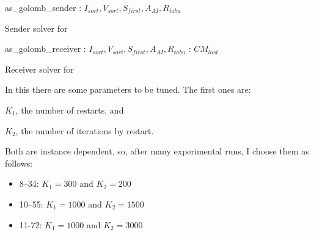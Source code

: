 \begin{algorithm}
\dontprintsemicolon
\SetNoline
{}
   as\_golomb\_sender\;
\algoindent {} : $I_{sort}, V_{sort}, S_{first}, A_{AI}, R_{tabu}$ \;
\caption{Sender solver for \GRP}\label{as:golomb_sender}
\end{algorithm}

\begin{algorithm}
\dontprintsemicolon
\SetNoline
{}
   as\_golomb\_receiver\;
\algoindent {} : $I_{sort}, V_{sort}, S_{first}, A_{AI}, R_{tabu}$ \;
\algoindent {}: $CM_{last}$\;
\caption{Receiver solver for \GRP}\label{as:golomb_receiver}
\end{algorithm}

In this \commstr{} there are some parameters to be tuned. The first ones are: \begin{inparaenum}[1.] \item $K_1$, the number of restarts, and \item $K_2$, the number of iterations by restart. \end{inparaenum} Both are instance dependent, so, after many experimental runs, I choose them as follows:
\begin{itemize}
\item \gr{} 8--34: $K_1 = 300$ and $K_2 = 200$
\item \gr{} 10--55: $K_1 = 1000$ and $K_2 = 1500$
\item \gr{} 11-72: $K_1 = 1000$ and $K_2 = 3000$
\end{itemize}

